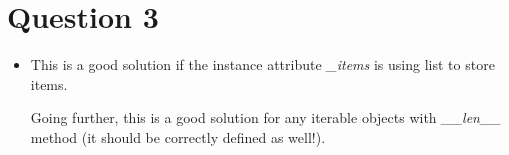 \documentclass[12pt]{article}
\begin{document}
\section*{Question 3}
\begin{itemize}
    \item

    This is a good solution if the instance attribute \textit{\_items}
    is using list to store items.

    \bigskip

    Going further, this is a good solution for any iterable objects with
    \textit{\_\_len\_\_} method (it should be correctly defined as well!).
\end{itemize}
\end{document}
